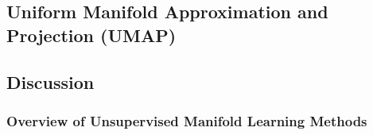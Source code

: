 \subsection{Uniform Manifold Approximation and Projection (UMAP)} \label{sec:UMAP}



\subsection{Discussion}

\subsubsection{Overview of Unsupervised Manifold Learning Methods}


